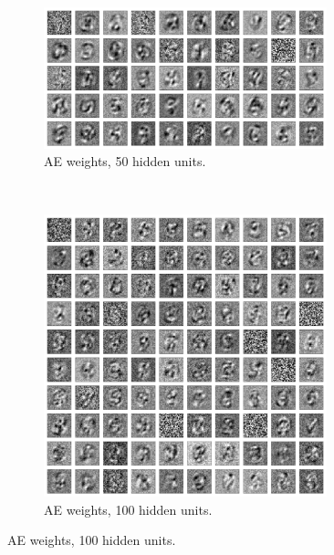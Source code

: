 \documentclass{article}
\begin{document}
\begin{figure}[!ht]
  \centering
  \begin{subfigure}[t]{0.47\textwidth}
    \centering
    \includegraphics[width=0.9\textwidth]{../plots/3_1_2/last_layer_50_components_100e.png}
    \caption{AE weights, 50 hidden units.}
  \end{subfigure}
  ~
  \begin{subfigure}[t]{0.47\textwidth}
    \centering
    \includegraphics[width=0.9\textwidth]{../plots/3_1_2/last_layer_100_components_100e.png}
    \caption{AE weights, 100 hidden units.}
  \end{subfigure}
\end{figure}
\end{document}
